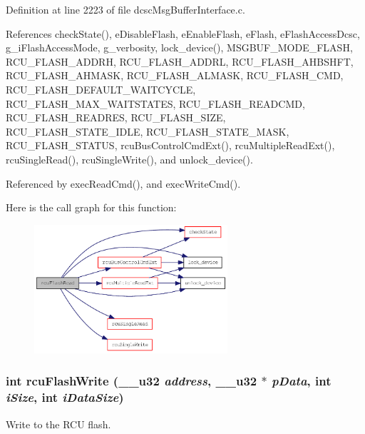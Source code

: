 Definition at line 2223 of file dcsc\-Msg\-Buffer\-Interface.c.

References check\-State(), e\-Disable\-Flash, e\-Enable\-Flash, e\-Flash, e\-Flash\-Access\-Dcsc, g\_\-i\-Flash\-Access\-Mode, g\_\-verbosity, lock\_\-device(), MSGBUF\_\-MODE\_\-FLASH, RCU\_\-FLASH\_\-ADDRH, RCU\_\-FLASH\_\-ADDRL, RCU\_\-FLASH\_\-AHBSHFT, RCU\_\-FLASH\_\-AHMASK, RCU\_\-FLASH\_\-ALMASK, RCU\_\-FLASH\_\-CMD, RCU\_\-FLASH\_\-DEFAULT\_\-WAITCYCLE, RCU\_\-FLASH\_\-MAX\_\-WAITSTATES, RCU\_\-FLASH\_\-READCMD, RCU\_\-FLASH\_\-READRES, RCU\_\-FLASH\_\-SIZE, RCU\_\-FLASH\_\-STATE\_\-IDLE, RCU\_\-FLASH\_\-STATE\_\-MASK, RCU\_\-FLASH\_\-STATUS, rcu\-Bus\-Control\-Cmd\-Ext(), rcu\-Multiple\-Read\-Ext(), rcu\-Single\-Read(), rcu\-Single\-Write(), and unlock\_\-device().

Referenced by exec\-Read\-Cmd(), and exec\-Write\-Cmd().

Here is the call graph for this function:\begin{figure}[H]
\begin{center}
\leavevmode
\includegraphics[width=203pt]{group__dcsc__msg__buffer__access_g24164f14711ead31a7e542711f0a08b3_cgraph}
\end{center}
\end{figure}
\hypertarget{group__dcsc__msg__buffer__access_g88debbd24075d2031add9459e4d90e2b}{
\subsubsection[rcuFlashWrite]{\setlength{\rightskip}{0pt plus 5cm}int rcu\-Flash\-Write (\_\-\_\-u32 {\em address}, \_\-\_\-u32 $\ast$ {\em p\-Data}, int {\em i\-Size}, int {\em i\-Data\-Size})}}
\label{group__dcsc__msg__buffer__access_g88debbd24075d2031add9459e4d90e2b}


Write to the RCU flash. 

